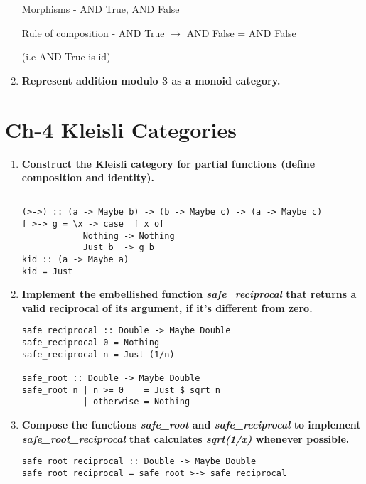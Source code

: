 \documentclass{article}
\begin{document}
\begin{enumerate}
	      Morphisms - AND True, AND False

	      Rule of composition - AND True $ \rightarrow $  AND False = AND False

	      (i.e AND True is id)
	\item \textbf{ Represent addition modulo 3 as a monoid category.}



\end{enumerate}

\section{ Ch-4 Kleisli Categories}
\begin{enumerate}
	\item \textbf{ Construct the Kleisli category for partial functions (define composition and identity).}

	      \begin{verbatim}
			
(>->) :: (a -> Maybe b) -> (b -> Maybe c) -> (a -> Maybe c)
f >-> g = \x -> case  f x of
            Nothing -> Nothing
            Just b  -> g b
kid :: (a -> Maybe a)
kid = Just 
	      \end{verbatim}
	\item \textbf{ Implement the embellished function \textit{safe\_reciprocal} that returns a valid reciprocal of its argument, if it’s different from zero. }

	      \begin{verbatim}
safe_reciprocal :: Double -> Maybe Double
safe_reciprocal 0 = Nothing 
safe_reciprocal n = Just (1/n)

safe_root :: Double -> Maybe Double
safe_root n | n >= 0    = Just $ sqrt n
            | otherwise = Nothing
\end{verbatim}
	\item \textbf{Compose the functions \textit{safe\_root} and \textit{safe\_reciprocal} to implement \textit{safe\_root\_reciprocal} that calculates \textit{sqrt(1/x)} whenever possible.}

	      \begin{verbatim}
safe_root_reciprocal :: Double -> Maybe Double 
safe_root_reciprocal = safe_root >-> safe_reciprocal

		\end{verbatim}
\end{enumerate}
\end{document}
